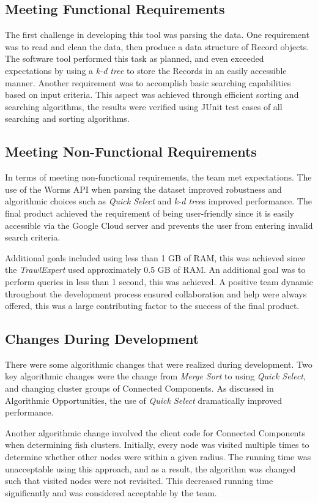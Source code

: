 \documentclass{article}
\begin{document}
\subsection{Meeting Functional Requirements}
The first challenge in developing this tool was parsing the data. One requirement was to read and clean the data, then produce a data structure of Record objects. The software tool performed this task as planned, and even exceeded expectations by using a \textit{k-d tree} to store the Records in an easily accessible manner. Another requirement was to accomplish basic searching capabilities based on input criteria. This aspect was achieved through efficient sorting and searching algorithms, the results were verified using JUnit test cases of all searching and sorting algorithms.

\subsection{Meeting Non-Functional Requirements}
In terms of meeting non-functional requirements, the team met expectations. The use of the Worms API when parsing the dataset improved robustness and algorithmic choices such as \textit{Quick Select} and \textit{k-d tree}s improved performance. The final product achieved the requirement of being user-friendly since it is easily accessible via the Google Cloud server and prevents the user from entering invalid search criteria. 

Additional goals included using less than 1 GB of RAM, this was achieved since the \textit{TrawlExpert} used approximately 0.5 GB of RAM. An additional goal was to perform queries in less than 1 second, this was achieved. A positive team dynamic throughout the development process ensured collaboration and help were always offered, this was a large contributing factor to the success of the final product. 

\subsection{Changes During Development}
There were some algorithmic changes that were realized during development. Two key algorithmic changes were the change from \textit{Merge Sort} to using \textit{Quick Select}, and changing cluster groups of Connected Components. As discussed in Algorithmic Opportunities, the use of \textit{Quick Select} dramatically improved performance. 

Another algorithmic change involved the client code for Connected Components when determining fish clusters. Initially, every node was visited multiple times to determine whether other nodes were within a given radius. The running time was unacceptable using this approach, and as a result, the algorithm was changed such that visited nodes were not revisited. This decreased running time significantly and was considered acceptable by the team. 
\end{document}

